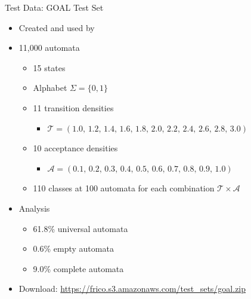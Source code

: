 \documentclass[12pt]{beamer}
\begin{document}
\begin{frame}{Test Data: GOAL Test Set}
\begin{itemize}
\item Created and used by~\cite{2011_tsai}
\pause
\item 11,000 automata
  \begin{itemize}
  \item 15 states
  \item Alphabet $\Sigma = \{0, 1\}$
  \pause
  \item 11 transition densities
    \begin{itemize}
    \item $\mathcal T=(1.0,\,1.2,\,1.4,\,1.6,\,1.8,\,2.0,\,2.2,\,2.4,\,2.6,\,2.8,\,3.0)$
    \end{itemize}
  \item 10 acceptance densities
    \begin{itemize}
    \item $\mathcal A=(0.1,\,0.2,\,0.3,\,0.4,\,0.5,\,0.6,\,0.7,\,0.8,\,0.9,\,1.0)$
    \end{itemize}
  \item 110 classes at 100 automata for each combination $\mathcal T \times \mathcal A$
  \end{itemize}
\pause
\item Analysis
  \begin{itemize}
  \item 61.8\% universal automata
  \item 0.6\% empty automata
  \item 9.0\% complete automata
  \end{itemize}
\pause
\item Download: \url{https://frico.s3.amazonaws.com/test_sets/goal.zip}
\end{itemize}
\end{frame}
\end{document}
